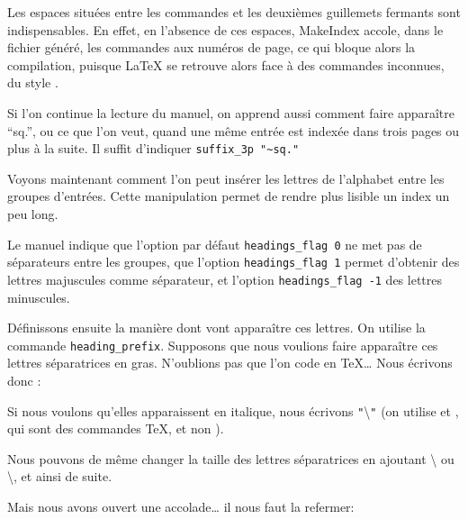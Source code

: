 \begin{attention}
Les espaces situées entre les commandes et les deuxièmes guillemets fermants sont indispensables. En effet, en l'absence de ces espaces, MakeIndex accole, dans le fichier  généré, les commandes aux numéros de page, ce qui bloque alors  la   compilation, puisque \LaTeX{} se retrouve alors face à des commandes inconnues, du style .
\end{attention}

Si l'on continue la lecture du manuel, on apprend aussi comment faire apparaître \enquote{sq.}, ou ce que l'on veut, quand une même entrée est indexée dans trois pages ou plus à la suite. Il suffit d'indiquer \verb+suffix_3p "~sq."+

Voyons maintenant comment l'on peut insérer les lettres de l'alphabet entre les groupes d'entrées. Cette manipulation permet de rendre plus lisible un index un peu long. 

Le manuel indique que l'option par défaut \verb+headings_flag 0+ ne met pas de séparateurs entre les groupes, que l'option \verb+headings_flag 1+ permet d'obtenir des lettres majuscules comme séparateur, et l'option  \verb+headings_flag -1+ des lettres minuscules.

Définissons ensuite la manière dont vont apparaître ces lettres. On utilise la commande \verb|heading_prefix|. Supposons que nous voulions faire apparaître ces lettres séparatrices en gras. N'oublions pas que l'on code en \TeX … Nous écrivons donc :

\begin{latexcode}
heading_prefix "{\\bfseries "
\end{latexcode} 

Si nous voulons qu'elles apparaissent en italique, nous écrivons \verb|"|\textbackslash{}\verb|"| (on utilise  et , qui sont des commandes \TeX, et non  ).

Nous  pouvons de même changer la taille des lettres séparatrices en ajoutant \textbackslash{} ou \textbackslash{}, et ainsi de suite. 

Mais nous avons ouvert une accolade… il nous faut la refermer:

\begin{latexcode}
heading_suffix " }\\nopagebreak\n " 
\end{latexcode}

